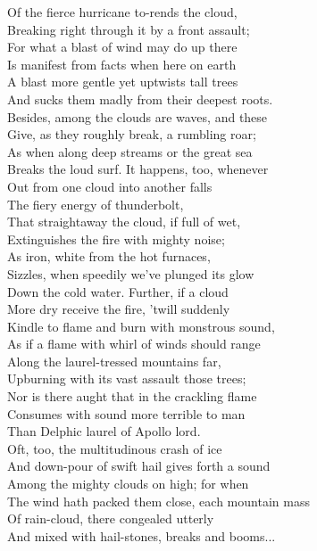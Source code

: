Of the fierce hurricane to-rends the cloud,\\
Breaking right through it by a front assault;\\
For what a blast of wind may do up there\\
Is manifest from facts when here on earth\\
A blast more gentle yet uptwists tall trees\\
And sucks them madly from their deepest roots.\\
Besides, among the clouds are waves, and these\\
Give, as they roughly break, a rumbling roar;\\
As when along deep streams or the great sea\\
Breaks the loud surf. It happens, too, whenever\\
Out from one cloud into another falls\\
The fiery energy of thunderbolt,\\
That straightaway the cloud, if full of wet,\\
Extinguishes the fire with mighty noise;\\
As iron, white from the hot furnaces,\\
Sizzles, when speedily we've plunged its glow\\
Down the cold water. Further, if a cloud\\
More dry receive the fire, 'twill suddenly\\
Kindle to flame and burn with monstrous sound,\\
As if a flame with whirl of winds should range\\
Along the laurel-tressed mountains far,\\
Upburning with its vast assault those trees;\\
Nor is there aught that in the crackling flame\\
Consumes with sound more terrible to man\\
Than Delphic laurel of Apollo lord.\\
Oft, too, the multitudinous crash of ice\\
And down-pour of swift hail gives forth a sound\\
Among the mighty clouds on high; for when\\
The wind hath packed them close, each mountain mass\\
Of rain-cloud, there congealed utterly\\
And mixed with hail-stones, breaks and booms...

